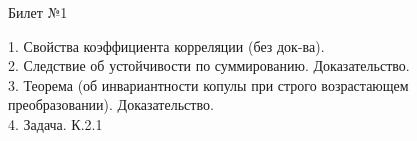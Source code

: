 \documentclass[preview]{standalone}
\begin{document}
 
\begin{center} {\Large Билет №1} \end{center} 

1.  Свойства коэффициента корреляции (без док-ва).\\

2.  Следствие об устойчивости по суммированию. Доказательство.\\

3.  Теорема (об инвариантности копулы при строго возрастающем преобразовании). Доказательство.\\

4. Задача. К.2.1\\
\end{document}
